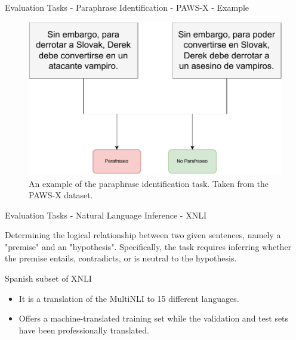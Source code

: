 \documentclass[aspectratio=169,xcolor=dvipsnames]{beamer}
\newenvironment{wideitemize}{\itemize\addtolength{\itemsep}{10pt}}{\enditemize}
\begin{document}
\begin{frame}{Evaluation Tasks - Paraphrase Identification - PAWS-X - Example}

\centering
\begin{figure}
    \includegraphics[scale=0.55]{images/nlp-example-paws-x.pdf}
    \caption{An example of the paraphrase identification task. Taken from the PAWS-X \citep{yang-etal-2019-paws} dataset.}
    \label{fig:nlp-example-paws-x}
\end{figure}

\end{frame}
\begin{frame}{Evaluation Tasks - Natural Language Inference - XNLI}

\begin{wideitemize}
    \item Determining the logical relationship between two given sentences, namely a "premise" and an "hypothesis". Specifically, the task requires inferring whether the premise entails, contradicts, or is neutral to the hypothesis.
    \item Spanish subset of XNLI \citep{conneau-etal-2018-xnli}
    \begin{itemize}
        \item It is a translation of the MultiNLI \citep{williams-etal-2018-broad} to 15 different languages.
        \item Offers a machine-translated training set while the validation and test sets have been professionally translated.
    \end{itemize}
\end{wideitemize}

\end{frame}
\end{document}
